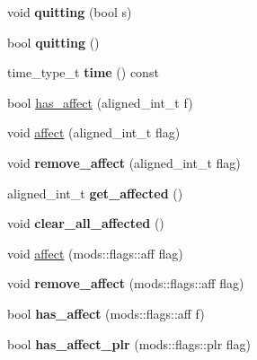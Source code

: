 \begin{DoxyCompactItemize}
void {\bfseries quitting} (bool s)
\item 
\mbox{\label{classmods_1_1player_aaf94c533345266b4537d16e50ff68a38}} 
bool {\bfseries quitting} ()
\item 
\mbox{\label{classmods_1_1player_a2f6a0f9164d7b60ecb206c814c6e1f8f}} 
time\+\_\+type\+\_\+t {\bfseries time} () const
\item 
bool \hyperlink{classmods_1_1player_ae7ad590bc136eac7a54ed0071a3e882b}{has\+\_\+affect} (aligned\+\_\+int\+\_\+t f)
\item 
void \hyperlink{classmods_1_1player_a5af5ab2621df94bc867bc56ab37b0099}{affect} (aligned\+\_\+int\+\_\+t flag)
\item 
\mbox{\label{classmods_1_1player_a88ed3db5da5810c43fa3870c053ae839}} 
void {\bfseries remove\+\_\+affect} (aligned\+\_\+int\+\_\+t flag)
\item 
\mbox{\label{classmods_1_1player_ae60241b6f2ad07c7fdd4126bc66acb1a}} 
aligned\+\_\+int\+\_\+t {\bfseries get\+\_\+affected} ()
\item 
\mbox{\label{classmods_1_1player_af23a9554f115730e529655a205dbe32c}} 
void {\bfseries clear\+\_\+all\+\_\+affected} ()
\item 
void \hyperlink{classmods_1_1player_a47a34f3be04cad723e561028c7ae24cd}{affect} (mods\+::flags\+::aff flag)
\item 
\mbox{\label{classmods_1_1player_ab8f8187a386f9a9264fbea2047f15006}} 
void {\bfseries remove\+\_\+affect} (mods\+::flags\+::aff flag)
\item 
\mbox{\label{classmods_1_1player_affc66459a833b6f9f242928f0ecfcee8}} 
bool {\bfseries has\+\_\+affect} (mods\+::flags\+::aff f)
\item 
\mbox{\label{classmods_1_1player_a19f76082128ca4e04a5b3e15be08efed}} 
bool {\bfseries has\+\_\+affect\+\_\+plr} (mods\+::flags\+::plr flag)
\item 
\mbox{\label{classmods_1_1player_afb04417525df1af56cbbf21c092d2d84}} 

\end{DoxyCompactItemize}
